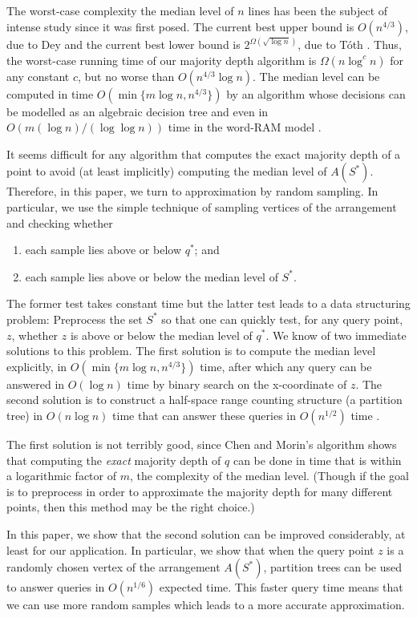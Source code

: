\documentclass{patmorin}
\begin{document}
The worst-case complexity the median level of $n$ lines has been the
subject of intense study since it was first posed.  The current best upper
bound is $O(n^{4/3})$, due to Dey \cite{d98} and the current best lower
bound is $2^{\Omega(\sqrt{\log n})}$, due to T\'oth \cite{t00}.  Thus, the
worst-case running time of our majority depth algorithm is $\Omega(n\log^c
n)$ for any constant $c$, but no worse than $O(n^{4/3}\log n)$.
The median level can be computed in time $O(\min\{m\log n,n^{4/3}\})$
by an algorithm whose decisions can be modelled as an algebraic decision
tree \cite{c99,bj02} and even in $O(m(\log n)/(\log\log n))$ time in the
word-RAM model \cite{dp07}.

It seems difficult for any algorithm that computes the exact majority
depth of a point to avoid (at least implicitly) computing the median
level of $A(S^*)$.  Therefore, in this paper, we turn to approximation by
random sampling.  In particular, we use the simple technique of sampling
vertices of the arrangement and checking whether
\begin{enumerate}
  \item each sample lies above or below $q^*$; and
  \item each sample lies above or below the median level of $S^*$.
\end{enumerate}

The former test takes constant time but the latter test leads to a
data structuring problem:  Preprocess the set $S^*$ so that one can
quickly test, for any query point, $z$, whether $z$ is above or below
the median level of $q^*$.   We know of two immediate solutions to this
problem.  The first solution is to compute the median level explicitly,
in $O(\min\{m\log n,n^{4/3}\})$ time, after which any query can be
answered in $O(\log n)$ time by binary search on the x-coordinate of $z$.
The second solution is to construct a half-space range counting structure
(a partition tree) in $O(n\log n)$ time that can answer these queries
in $O(n^{1/2})$ time \cite{c12}.

The first solution is not terribly good, since Chen and Morin's algorithm
shows that computing the \emph{exact} majority depth of $q$ can be done
in time that is within a logarithmic factor of $m$, the complexity of
the median level.  (Though if the goal is to preprocess in order to
approximate the majority depth for many different points, then this
method may be the right choice.)

In this paper, we show that the second solution can be improved
considerably, at least for our application.  In particular, we show that
when the query point $z$ is a randomly chosen vertex of the arrangement
$A(S^*)$, partition trees can be used to answer queries in $O(n^{1/6})$
expected time.  This faster query time means that we can use more random
samples which leads to a more accurate approximation.
\end{document}
